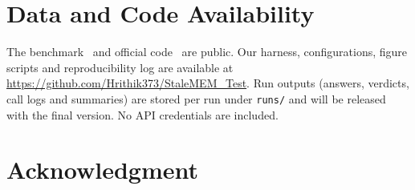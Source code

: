 \documentclass[conference]{IEEEtran}
\newcommand{\code}[1]{\texttt{\small #1}}
\begin{document}
\section*{Data and Code Availability}
The benchmark~\cite{stale_dataset} and official code~\cite{stale_code} are public. Our harness, configurations, figure scripts and reproducibility log are available at \url{https://github.com/Hrithik373/StaleMEM_Test}. Run outputs (answers, verdicts, call logs and summaries) are stored per run under \code{runs/} and will be released with the final version. No API credentials are included.

\section*{Acknowledgment}



\end{document}
